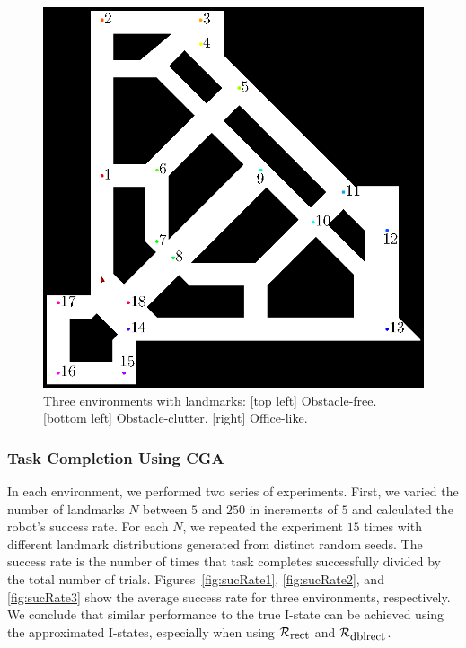 \begin{figure}
\begin{minipage}[b]{0.45\textwidth}
    \includegraphics[scale=0.65]{figs/office}    
  \end{minipage}
  \caption{Three environments with landmarks: [top left] Obstacle-free. [bottom
    left] Obstacle-clutter. [right] Office-like.}
  \label{fig:env}
\end{figure}

\subsubsection{Task Completion Using CGA}
In each environment, we performed two series of experiments. 
%
First, we varied the number of landmarks $N$ between $5$ and $250$ in increments of $5$ and calculated the
robot's success rate.  
%
For each $N$, we repeated the experiment $15$ times with different landmark distributions generated from distinct random seeds. 
%
The success rate is the number of times that task completes successfully divided by
the total number of trials.  
%
Figures~\ref{fig:sucRate1}, \ref{fig:sucRate2}, and \ref{fig:sucRate3} show the average success rate for three environments, respectively. 
%
We conclude that similar performance to the true I-state can be achieved using the approximated I-states, 
especially when using $\mathcal{R}_{\mbox{\small rect}}$ and $\mathcal{R}_{\mbox{\small dblrect}}$.

